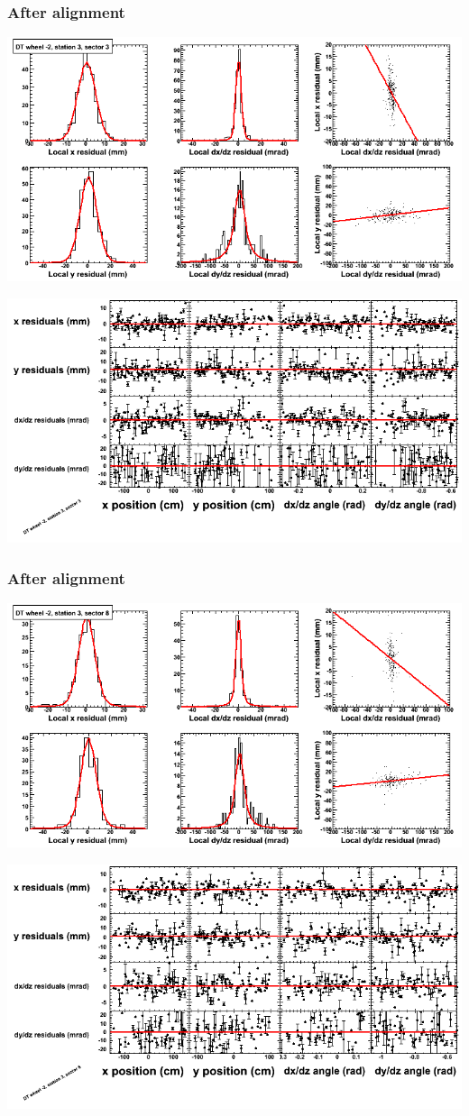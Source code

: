 \documentclass[compress]{beamer}
\begin{document}
\begin{frame}
\frametitle{After alignment}
\includegraphics[width=0.7\linewidth]{NOV4_fitfunctions/MBwhAst3sec03_bellcurves.png}

\includegraphics[width=0.7\linewidth]{NOV4_fitfunctions/MBwhAst3sec03_polynomials.png}
\end{frame}

\begin{frame}
\frametitle{After alignment}
\includegraphics[width=0.7\linewidth]{NOV4_fitfunctions/MBwhAst3sec08_bellcurves.png}

\includegraphics[width=0.7\linewidth]{NOV4_fitfunctions/MBwhAst3sec08_polynomials.png}
\end{frame}
\end{document}

